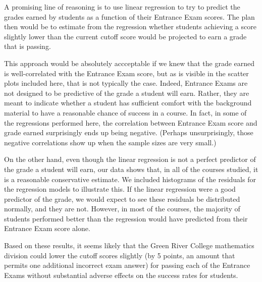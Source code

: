 \documentclass[twoside]{article}\usepackage[]{graphicx}\usepackage[]{color}
\begin{document}


A promising line of reasoning is to use linear regression to try to predict the grades earned by students as a function of their Entrance Exam scores.  The plan then would be to estimate from the regression whether students achieving a score slightly lower than the current cutoff score would 
be projected to earn a grade that is passing.  

This approach would be absolutely accceptable if we knew that the grade earned is well-correlated with the Entrance Exam score, but as is visible in the scatter plots included here, that is not typically the case.  Indeed, Entrance Exams are not designed to be predictive of the grade a student will earn. Rather, they are meant to indicate whether a student has sufficient comfort with the background material to have a reasonable chance of success in a course.  In fact, in some of the regressions performed here, the correlation between Entrance Exam score and grade earned surprisingly ends up being negative.  (Perhaps unsurprisingly, those negative correlations show up when the sample sizes are very small.)

On the other hand, even though the linear regression is not a perfect predictor of the grade a student will earn, our data shows that, in all of the courses studied, it is a reasonable conservative estimate.  We included histograms of the residuals for the regression models to illustrate this.  If the linear regression were a good predictor of the grade, we would expect to see these residuals be distributed normally, and they are not.  However, in most of the courses, the majority of students performed better than the regression would have predicted from their Entrance Exam score alone.

Based on these results, it seems likely that the Green River College mathematics division could lower the cutoff scores slightly (by 5 points, an amount that permits one additional incorrect exam answer) for passing each of the Entrance Exams without substantial adverse effects on the success rates for students.
\end{document}
